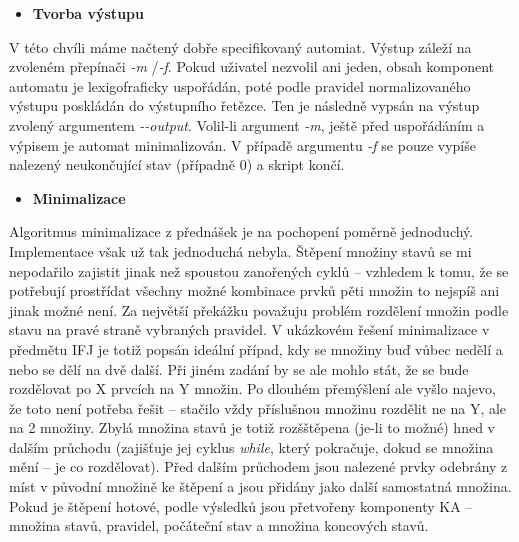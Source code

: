 \documentclass[11pt,a4paper]{article}
\begin{document}
\begin{itemize}[leftmargin=0cm]
\item{\textbf{Tvorba výstupu}}
\end{itemize}
V této chvíli máme načtený dobře specifikovaný automiat. Výstup záleží na zvoleném přepínači \emph{-m} /\emph{-f}. Pokud uživatel nezvolil ani jeden, obsah komponent automatu je lexigofraficky uspořádán, poté podle pravidel normalizovaného výstupu poskládán do výstupního řetězce. Ten je následně vypsán na výstup zvolený argumentem \emph{-\--output}. Volil-li argument \emph{-m}, ještě před uspořádáním a výpisem je automat minimalizován. V případě argumentu \emph{-f} se pouze vypíše nalezený neukončující stav (případně 0) a skript končí.


\begin{itemize}[leftmargin=0cm]
\item{\textbf{Minimalizace}}
\end{itemize}
Algoritmus minimalizace z přednášek je na pochopení poměrně jednoduchý. Implementace však už tak jednoduchá nebyla. Štěpení množiny stavů se mi nepodařilo zajistit jinak než spoustou zanořených cyklů -- vzhledem k tomu, že se potřebují prostřídat všechny možné kombinace prvků pěti množin to nejspíš ani jinak možné není. Za největší překážku považuju problém rozdělení množin podle stavu na pravé straně vybraných pravidel. V ukázkovém řešení minimalizace v předmětu IFJ je totiž popsán ideální případ, kdy se množiny buď vůbec nedělí a nebo se dělí na dvě další. Při jiném zadání by se ale mohlo stát, že se bude rozdělovat po X prvcích na Y množin. Po dlouhém přemýšlení ale vyšlo najevo, že toto není potřeba řešit -- stačilo vždy příslušnou množinu rozdělit ne na Y, ale na 2 množiny. Zbylá množina stavů je totiž rozšštěpena (je-li to možné) hned v dalším průchodu (zajišťuje jej cyklus \emph{while}, který pokračuje, dokud se množina mění -- je co rozdělovat). Před dalším průchodem jsou nalezené prvky odebrány z míst v původní množině ke štěpení a jsou přidány jako další samostatná množina. Pokud je štěpení hotové, podle výsledků jsou přetvořeny komponenty KA -- množina stavů, pravidel, počáteční stav a množina koncových stavů.
\end{document}
